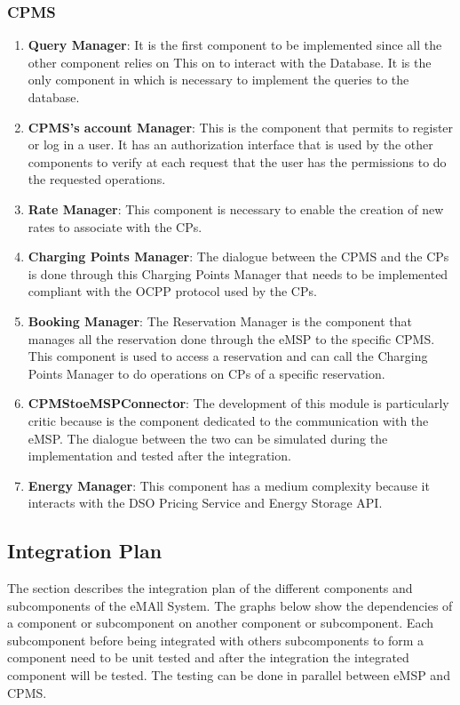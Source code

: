 \subsubsection{CPMS}
\begin{enumerate}
    \item \textbf{Query Manager}: It is the first component to be implemented since all the other component relies on This
    on to interact with the Database. It is the only component in which is necessary to implement the queries to the database.
    \item \textbf{CPMS's account Manager}: This is the component that permits to register or log in a user. It has an authorization interface that 
    is used by the other components to verify at each request that the user has the permissions to do the requested operations.
    \item \textbf{Rate Manager}: This component is necessary to enable the creation of new rates to associate with the CPs.
    \item \textbf{Charging Points Manager}: The dialogue between the CPMS and the CPs is done through this Charging Points Manager that 
    needs to be implemented compliant with the OCPP protocol used by the CPs.
    \item \textbf{Booking Manager}: The Reservation Manager is the component
    that manages all the reservation done through the eMSP to the specific CPMS. This component is used to access a reservation and can call the 
    Charging Points Manager to do operations on CPs of a specific reservation.
    \item \textbf{CPMStoeMSPConnector}: The development of this module is particularly critic because is the component dedicated
    to the communication with the eMSP. The dialogue between the two can be simulated during the implementation and tested after the integration.
    \item \textbf{Energy Manager}: This component has a medium complexity because it interacts with the DSO Pricing Service and Energy Storage API. 
\end{enumerate}

\subsection{Integration Plan}
The section describes the integration plan of the different components and subcomponents of the eMAll System. 
The graphs below show the dependencies of a component or subcomponent on another component or subcomponent. Each subcomponent before being integrated with others subcomponents
to form a component need to be unit tested and after the integration the integrated component will be tested.
The testing can be done in parallel between eMSP and CPMS.
